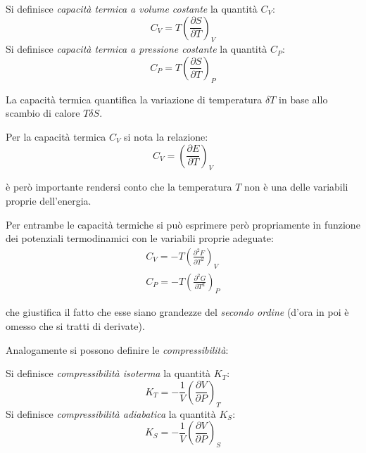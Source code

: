 \begin{defn}
	Si definisce \textit{capacità termica a volume costante} la quantità $C_V$:
	\begin{equation*}
	C_V = T \left(\frac{\partial S}{\partial T}\right)_V
	\end{equation*}
	Si definisce \textit{capacità termica a pressione costante} la quantità $C_P$:
	\begin{equation*}
	C_P = T \left(\frac{\partial S}{\partial T}\right)_P
	\end{equation*}
\end{defn}

\noindent La capacità termica quantifica la variazione di temperatura $\delta T$ in base allo scambio di calore $T \delta S$.

Per la capacità termica $C_V$ si nota la relazione:
\begin{equation*}
C_V = \left(\frac{\partial E}{\partial T}\right)_V
\end{equation*}

\noindent è però importante rendersi conto che la temperatura $T$ non è una delle variabili proprie dell'energia.

Per entrambe le capacità termiche si può esprimere però propriamente in funzione dei potenziali termodinamici con le variabili proprie adeguate:
\begin{align*}
C_V = - T \left(\frac{\partial^2 F}{\partial T^2}\right)_V\\
C_P = - T \left(\frac{\partial^2 G}{\partial T^2}\right)_P
\end{align*}

\noindent che giustifica il fatto che esse siano grandezze del \textit{secondo ordine} (d'ora in poi è omesso che si tratti di derivate).

Analogamente si possono definire le \textit{compressibilità}:

\begin{defn}[Compressibilità]
	Si definisce \textit{compressibilità isoterma} la quantità $K_T$:
	\begin{equation*}
	K_T = - \frac{1}{V} \left(\frac{\partial V}{\partial P}\right)_T
	\end{equation*}
	Si definisce \textit{compressibilità adiabatica} la quantità $K_S$:
	\begin{equation*}
	K_S = - \frac{1}{V} \left(\frac{\partial V}{\partial P}\right)_S
	\end{equation*}
\end{defn}

